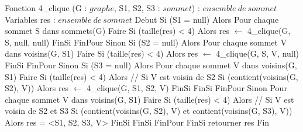 \begin{algorithm}[caption={4-clique}] \label{alg:4clique}
    Fonction 4_clique (G : $graphe$, S1, S2, S3 : $sommet$) : $ensemble\ de\ sommet$
    Variables
        res : $ensemble\ de\ sommet$
    Debut
        Si (S1 = null) Alors
            Pour chaque sommet S dans sommets(G) Faire
                Si (taille(res) < 4) Alors
                    res $\gets$ 4_clique(G, S, null, null)
                FinSi
            FinPour
        Sinon Si (S2 = null) Alors
            Pour chaque sommet V dans voisins(G, S1) Faire
                Si (taille(res) < 4) Alors
                    res $\gets$ 4_clique(G, S, V, null)
                FinSi
            FinPour
        Sinon Si (S3 = null) Alors
            Pour chaque sommet V dans voisins(G, S1) Faire
                Si (taille(res) < 4) Alors
                    // Si V est voisin de S2
                    Si (contient(voisins(G, S2), V)) Alors
                        res $\gets$ 4_clique(G, S1, S2, V)
                    FinSi
                FinSi
            FinPour
        Sinon
            Pour chaque sommet V dans voisins(G, S1) Faire
                Si (taille(res) < 4) Alors
                    // Si V est voisin de S2 et S3
                    Si (contient(voisins(G, S2), V) et contient(voisins(G, S3), V)) Alors
                        res = <S1, S2, S3, V>
                    FinSi
                FinSi
            FinPour
        FinSi
        retourner res
    Fin
\end{algorithm}